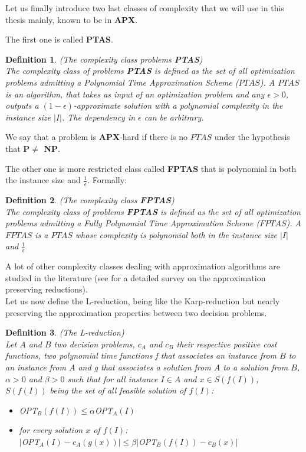 \documentclass[a4paper]{book}
\newtheorem{definition}{Definition}
\begin{document}
Let us finally introduce two last classes of complexity that we will use in this thesis mainly, known to be in \textbf{APX}.

The first one is called \textbf{PTAS}.
\begin{definition}{\emph{(The complexity class problems \textbf{PTAS})}}\\
The complexity class of problems \emph{\textbf{PTAS}} is defined as the set of all optimization problems admitting a Polynomial Time Approximation Scheme ($PTAS$). A $PTAS$ is an algorithm, that takes as input of an optimization problem and any $\epsilon >0$, outputs a $(1-\epsilon)$-approximate solution with a polynomial complexity in the instance size $|I|$. The dependency in $\epsilon$ can be arbitrary. 

\end{definition}
We say that a problem is \textbf{APX}-hard if there is no $PTAS$ under the hypothesis that \textbf{P$\ne$ NP}. 

The other one is more restricted class called \textbf{FPTAS} that is polynomial in both the instance size and $\frac{1}{\epsilon}$.
Formally:
\begin{definition}{\emph{(The complexity class \textbf{FPTAS})}}\\
The complexity class of problems \emph{\textbf{FPTAS}} is defined as the set of all optimization problems admitting a Fully Polynomial Time Approximation Scheme ($FPTAS$). A $FPTAS$ is a $PTAS$ whose complexity is polynomial both in the instance size $|I|$ and $\frac{1}{\epsilon}$

\end{definition}

A lot of other complexity classes dealing with approximation algorithms are studied in the literature  (see \cite{ausiello2005approximability} for a detailed survey on the approximation preserving reductions). \\

Let us now define the L-reduction, being like the Karp-reduction but nearly preserving the approximation properties between two decision problems.%
\begin{definition}{\emph{(The L-reduction)}}\\
Let $A$ and $B$ two decision problems, $c_A$ and $c_B$ their respective positive cost functions, two polynomial time functions f that associates an instance from $B$ to an instance from $A$ and g that associates a solution from $A$ to a solution from $B$, $\alpha >0$ and $\beta >0 $ such that for all instance $I \in A$ and $x \in S(f(I))$, $S(f(I))$ being the set of all feasible solution of $f(I)$:
\begin{itemize}
    \item OPT$_B(f(I))\leq \alpha $OPT$_A(I)$
    \item for every solution $x$ of $f(I)$:\\ 
    $|$OPT$_A(I)-c_A(g(x))|\leq \beta|$OPT$_B(f(I))-c_B(x)|$

\end{itemize}
\end{definition}
\end{document}
